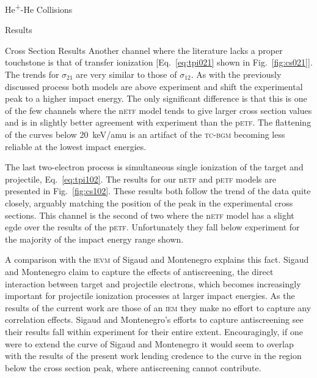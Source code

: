 \documentclass[a5paper, 9 pt]{extreport}
\begin{document}
\begin{chapter}{\texorpdfstring{He\textsuperscript{+}}{He+}-He Collisions \label{chap:hephe}}
\begin{section}{Results \label{sec:hephe-disc}}
\begin{subsection}{Cross Section Results \label{sec:hephe-res}}
         Another channel where the literature lacks a proper touchstone is that of transfer ionization
         [Eq.~\eqref{eq:tpi021} shown in Fig.~\ref{fig:cs021}]. The trends for $\sigma_{21}$ are very
         similar to those of $\sigma_{12}$. As with the previously discussed process both models are
         above experiment and shift the experimental peak to a higher impact energy. The only
         significant difference is that this is one of the few channels where the n\textsc{etf} model
         tends to give larger cross section values and is in slightly better agreement with experiment
         than the p\textsc{etf}. The flattening of the curves below 20~keV/amu is an artifact of the
         \textsc{tc-bgm} becoming less reliable at the lowest impact energies.

         The last two-electron process is simultaneous single ionization of the target and projectile,
         Eq.~\eqref{eq:tpi102}. The results for our n\textsc{etf} and p\textsc{etf} models are presented
         in Fig.~\ref{fig:cs102}. These results both follow the trend of the data quite closely,
         arguably matching the position of the peak in the experimental cross sections. This channel is
         the second of two where the n\textsc{etf} model has a slight egde over the results of the
         p\textsc{etf}. Unfortunately they fall below experiment for the majority of the impact energy
         range shown.

         A comparison with the \textsc{ievm} of Sigaud and Montenegro explains this fact. Sigaud and
         Montenegro claim to capture the effects of antiscreening, the direct interaction between target
         and projectile electrons, which becomes increasingly important for projectile ionization
         processes at larger impact energies. As the results of the current work are those of an
         \textsc{iem} they make no effort to capture any correlation effects. Sigaud and Montenegro's
         efforts to capture antiscreening see their results fall within experiment for their entire
         extent. Encouragingly, if one were to extend the curve of Sigaud and Montenegro it would seem
         to overlap with the results of the present work lending credence to the curve in the region
         below the cross section peak, where antiscreening cannot contribute.


\end{subsection}
\end{section}
\end{chapter}
\end{document}
